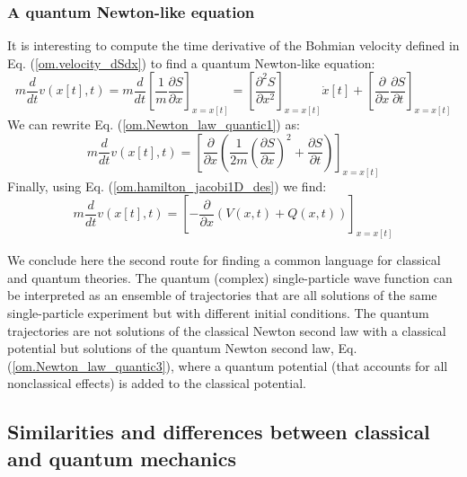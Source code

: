 \documentclass[onecolumn,nofootinbib, secnumarabic, amsmath, nobibnotes,11pt,aps,pra]{revtex4-1}
\newcommand{\eref}[1]{Eq. (\ref{#1})}
\begin{document}
\subsubsection{A quantum Newton-like equation}

It is interesting to compute the time derivative of the Bohmian velocity defined in \eref{om.velocity_dSdx} to find a quantum Newton-like equation:
\begin{equation}
\label{om.Newton_law_quantic1}
m\frac {d} {dt} v(x[t],t)\! =\! m \frac {d} {dt} \left[ \frac{1}{m} \frac {\partial S} {\partial x} \right]_{x = x[t]} \!=\! \left[ \frac {\partial^2 S} {\partial x^2}\right]_{x = x[t]} \dot{x}[t] + \left[\frac {\partial} {\partial x} \frac {\partial S} {\partial t} \right]_{x = x[t]}
\end{equation}
We can rewrite \eref{om.Newton_law_quantic1} as:
\begin{equation}
\label{om.Newton_law_quantic2}
m\frac {d} {dt} v(x[t],t) = \left[ \frac {\partial} {\partial x} \left(\frac {1} {2m} \left(\frac {\partial S} {\partial x} \right)^{2} + \frac {\partial S} {\partial t} \right) \right]_{x = x[t]}
\end{equation}
Finally, using \eref{om.hamilton_jacobi1D_des} we find:
\begin{equation}
\label{om.Newton_law_quantic3}
m\frac {d} {dt} v(x[t],t) = \left[ -\frac {\partial} {\partial x} \left(V(x,t) + Q(x,t) \right) \right]_{x = x[t]}
\end{equation}

We conclude here the second route for finding a common language for
classical and quantum theories. The quantum (complex)
single-particle wave function can be interpreted as an ensemble of
trajectories that are all solutions of the same single-particle
experiment but with different initial conditions. The quantum
trajectories are not solutions of the classical Newton second  law with a
classical potential but solutions of the quantum Newton second law,
\eref{om.Newton_law_quantic3}, where a quantum potential (that
accounts for all nonclassical effects) is added to the classical
potential.

\subsection{Similarities and differences between classical and quantum mechanics}\label{om.sec_single.4}
\end{document}
